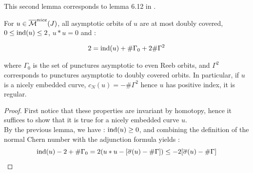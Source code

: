 \documentclass[../main.tex]{subfiles}
\begin{document}
This second lemma corresponds to lemma 6.12 in \cite{SOBD2}.

\begin{lemma}
    For $u \in \overline{\mathcal{M}}^{nice}(J)$, all asymptotic orbits of $u$ are at most doubly covered,  $0\leq \text{ind}(u)\leq 2$, $u* u  = 0$ and :

    $$2 = \text{ind}(u) + \#\Gamma_0 + 2\#\Gamma^2$$

    where $\Gamma_0$ is the set of punctures asymptotic to even Reeb orbits, and $\Gamma^2$ corresponds to punctures asymptotic to doubly covered orbits. In particular, if $u$ is a nicely embedded curve, $c_N(u) = - \#\Gamma^2$ hence $u$ has positive index, it is regular.
\end{lemma}

\begin{proof}

First notice that these properties are invariant by homotopy, hence it suffices to show that it is true for a nicely embedded curve $u$.\\
By the previous lemma, we have : $\text{ind}(u) \geq 0$, and combining the definition of the normal Chern number with the adjunction formula yields : 
$$\text{ind}(u) - 2 + \#\Gamma_0  = 2(u*u - [\overline{\sigma}(u) - \#\Gamma])\leq  -2[\overline{\sigma}(u) -\#\Gamma]$$


\end{proof}
\end{document}
